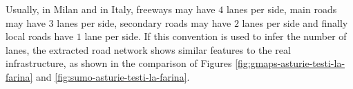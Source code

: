 Usually, in Milan and in Italy, freeways may have $4$ lanes per side, main roads may have $3$ lanes per side, secondary roads may have $2$ lanes per side and finally local roads have $1$ lane per side.
If this convention is used to infer the number of lanes, the extracted road network shows similar features to the real infrastructure, as shown in the comparison of Figures \ref{fig:gmaps-asturie-testi-la-farina} and \ref{fig:sumo-asturie-testi-la-farina}.

\begin{table}[H]
  \label{tbl:amat-nodes-file}
\end{table}

